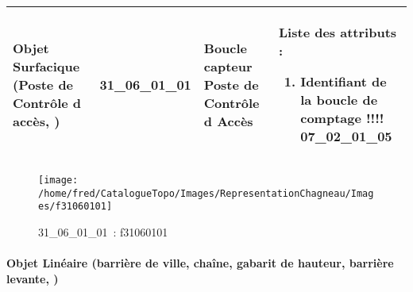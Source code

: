 \documentclass[12pt,titlepage]{book}
\begin{document}
\renewcommand{\arraystretch}{1.2}
\begin{supertabular}{|p{10cm}|c|p{13cm}|p{12cm}|}
 Objet Surfacique (Poste de Contrôle d accès,  ) & 31\_06\_01\_01 & Boucle capteur Poste de Contrôle d Accès & Liste des attributs :
\begin{enumerate}
  \item Identifiant de la boucle de comptage !!!!  07\_02\_01\_05\end{enumerate}
\\
\hline
\end{supertabular}
\begin{figure}[h!]
  \hfill         %
  \begin{minipage}[t]{3cm}
    \begin{center}
      \texttt{[image: /home/fred/CatalogueTopo/Images/RepresentationChagneau/Images/f31060101]}
      \caption[~31\_06\_01\_01]{\small{31\_06\_01\_01~:} \tiny{f31060101}}\label{f31060101}
    \end{center}
  \end{minipage}
\end{figure}


\paragraph{Objet Linéaire (barrière de ville, chaîne, gabarit de hauteur, barrière levante,  )}
\noindent
\vspace{\baselineskip}
\end{document}
